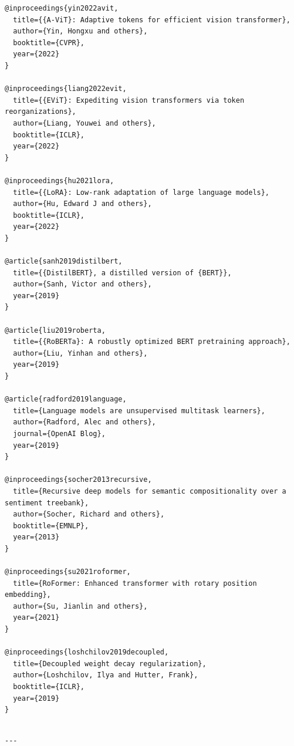 \begin{lstlisting}
@inproceedings{yin2022avit,
  title={{A-ViT}: Adaptive tokens for efficient vision transformer},
  author={Yin, Hongxu and others},
  booktitle={CVPR},
  year={2022}
}

@inproceedings{liang2022evit,
  title={{EViT}: Expediting vision transformers via token reorganizations},
  author={Liang, Youwei and others},
  booktitle={ICLR},
  year={2022}
}

@inproceedings{hu2021lora,
  title={{LoRA}: Low-rank adaptation of large language models},
  author={Hu, Edward J and others},
  booktitle={ICLR},
  year={2022}
}

@article{sanh2019distilbert,
  title={{DistilBERT}, a distilled version of {BERT}},
  author={Sanh, Victor and others},
  year={2019}
}

@article{liu2019roberta,
  title={{RoBERTa}: A robustly optimized BERT pretraining approach},
  author={Liu, Yinhan and others},
  year={2019}
}

@article{radford2019language,
  title={Language models are unsupervised multitask learners},
  author={Radford, Alec and others},
  journal={OpenAI Blog},
  year={2019}
}

@inproceedings{socher2013recursive,
  title={Recursive deep models for semantic compositionality over a sentiment treebank},
  author={Socher, Richard and others},
  booktitle={EMNLP},
  year={2013}
}

@inproceedings{su2021roformer,
  title={RoFormer: Enhanced transformer with rotary position embedding},
  author={Su, Jianlin and others},
  year={2021}
}

@inproceedings{loshchilov2019decoupled,
  title={Decoupled weight decay regularization},
  author={Loshchilov, Ilya and Hutter, Frank},
  booktitle={ICLR},
  year={2019}
}
\end{lstlisting}
\begin{lstlisting}

---
\end{lstlisting}